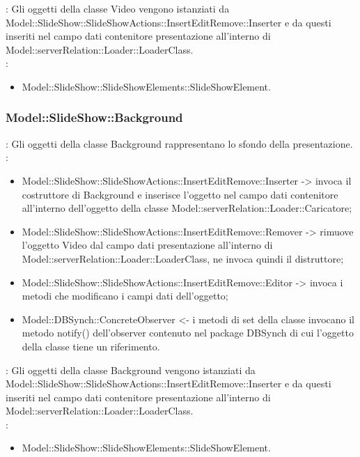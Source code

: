 {{{{{{{{{{{\begin{itemize}
			\end{itemize}	
            \textbf{\interfacce}: Gli oggetti della classe Video vengono istanziati da Model::\-SlideShow::\-SlideShowActions::\-InsertEditRemove::\-Inserter e da questi inseriti nel campo dati contenitore presentazione all’interno di \\Model::\-serverRelation::\-Loader::\-LoaderClass.\\
            \textbf{\base}: 
                \begin{itemize}
                \item Model::\-SlideShow::\-SlideShowElements::\-SlideShowElement.
                \end{itemize}
                }     
             \subsubsection{Model::\-SlideShow::\-Background}{
            				\textbf{\tipo}: Gli oggetti della classe Background rappresentano lo sfondo della presentazione.\\
            				\textbf{\relaz}: 
            				\begin{itemize}
            					\item Model::\-SlideShow::\-SlideShowActions::\-InsertEditRemove::\-Inserter -> invoca il costruttore di Background e inserisce l’oggetto nel campo dati contenitore all’interno dell’oggetto della classe Model::\-serverRelation::\-Loader::\-Caricatore;
                                \item Model::\-SlideShow::\-SlideShowActions::\-InsertEditRemove::\-Remover -> rimuove l’oggetto Video dal campo dati presentazione all’interno di Model::\-serverRelation::\-Loader::\-LoaderClass, ne invoca quindi il distruttore;
                                \item Model::\-SlideShow::\-SlideShowActions::\-InsertEditRemove::\-Editor -> invoca i metodi che modificano i campi dati dell'oggetto;
                \item Model::\-DBSynch::\-ConcreteObserver <- i metodi di set della classe invocano il metodo notify() dell'observer contenuto nel package DBSynch di cui l'oggetto della classe tiene un riferimento.
            				\end{itemize}	
                            \textbf{\interfacce}: Gli oggetti della classe Background vengono istanziati da Model::\-SlideShow::\-SlideShowActions::\-InsertEditRemove::\-Inserter e da questi inseriti nel campo dati contenitore presentazione all’interno di\\ Model::\-serverRelation::\-Loader::\-LoaderClass.\\
                            \textbf{\base}: 
                                \begin{itemize}
                                \item Model::\-SlideShow::\-SlideShowElements::\-SlideShowElement.
                                \end{itemize}
                                }              
}


}}}}}}}}}
